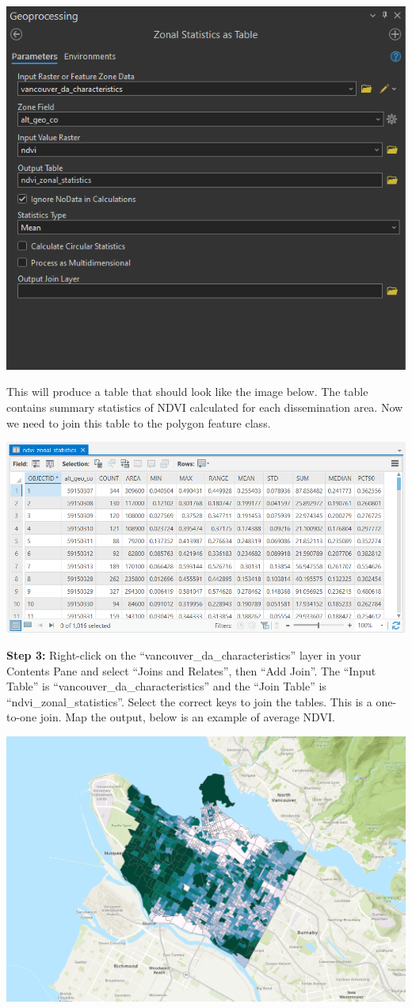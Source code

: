 \documentclass[
]{book}
\begin{document}
\includegraphics[width=0.75\linewidth]{images/06-arcgis-zonal-statistics}

This will produce a table that should look like the image below. The table contains summary statistics of NDVI calculated for each dissemination area. Now we need to join this table to the polygon feature class.

\includegraphics[width=0.75\linewidth]{images/06-arcgis-zonal-statistics-table}

\textbf{Step 3:} Right-click on the ``vancouver\_da\_characteristics'' layer in your Contents Pane and select ``Joins and Relates'', then ``Add Join''. The ``Input Table'' is ``vancouver\_da\_characteristics'' and the ``Join Table'' is ``ndvi\_zonal\_statistics''. Select the correct keys to join the tables. This is a one-to-one join. Map the output, below is an example of average NDVI.

\includegraphics[width=1\linewidth]{images/06-arcgis-ndvi-mean}
\end{document}

